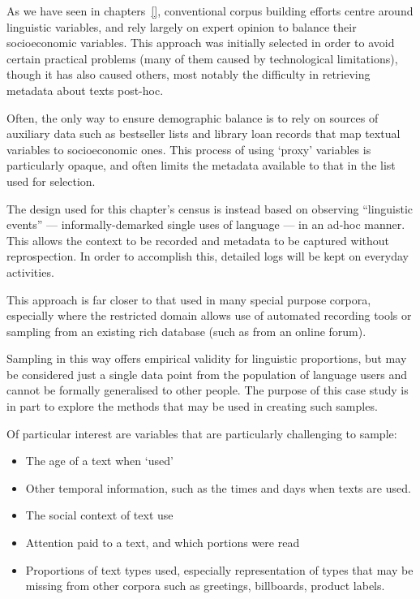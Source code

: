 As we have seen in chapters~\ref{}, conventional corpus building efforts centre around linguistic variables, and rely largely on expert opinion to balance their socioeconomic variables.  This approach was initially selected in order to avoid certain practical problems (many of them caused by technological limitations), though it has also caused others, most notably the difficulty in retrieving metadata about texts post-hoc.

Often, the only way to ensure demographic balance is to rely on sources of auxiliary data such as bestseller lists and library loan records that map textual variables to socioeconomic ones.  This process of using `proxy' variables is particularly opaque, and often limits the metadata available to that in the list used for selection.

The design used for this chapter's census is instead based on observing ``linguistic events'' --- informally-demarked single uses of language --- in an ad-hoc manner.  This allows the context to be recorded and metadata to be captured without reprospection.  In order to accomplish this, detailed logs will be kept on everyday activities.

This approach is far closer to that used in many special purpose corpora, especially where the restricted domain allows use of automated recording tools or sampling from an existing rich database (such as from an online forum).

Sampling in this way offers empirical validity for linguistic proportions, but may be considered just a single data point from the population of language users and cannot be formally generalised to other people.  The purpose of this case study is in part to explore the methods that may be used in creating such samples.

Of particular interest are variables that are particularly challenging to sample:

\begin{itemize}
    \item The age of a text when `used'
    \item Other temporal information, such as the times and days when texts are used.
    \item The social context of text use
    \item Attention paid to a text, and which portions were read
    \item Proportions of text types used, especially representation of types that may be missing from other corpora such as greetings, billboards, product labels.
\end{itemize}

